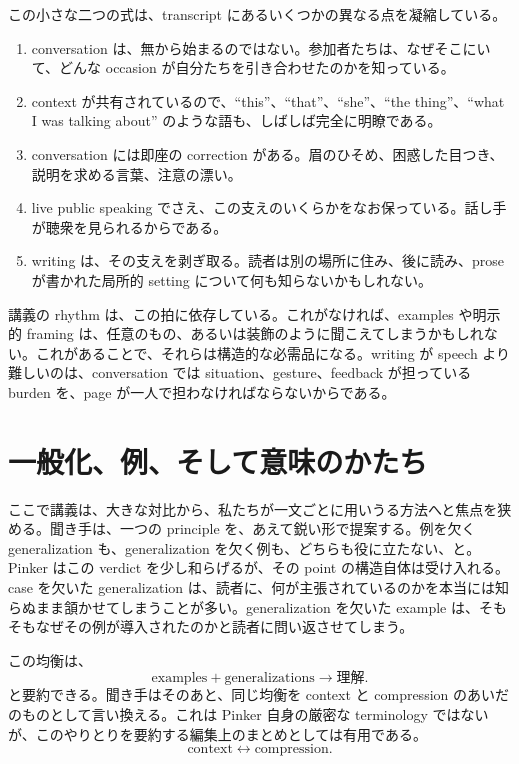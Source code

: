この小さな二つの式は、transcript にあるいくつかの異なる点を凝縮している。
\begin{enumerate}
\item conversation は、無から始まるのではない。参加者たちは、なぜそこにいて、どんな occasion が自分たちを引き合わせたのかを知っている。
\item context が共有されているので、``this''、``that''、``she''、``the thing''、``what I was talking about'' のような語も、しばしば完全に明瞭である。
\item conversation には即座の correction がある。眉のひそめ、困惑した目つき、説明を求める言葉、注意の漂い。
\item live public speaking でさえ、この支えのいくらかをなお保っている。話し手が聴衆を見られるからである。
\item writing は、その支えを剥ぎ取る。読者は別の場所に住み、後に読み、prose が書かれた局所的 setting について何も知らないかもしれない。
\end{enumerate}

講義の rhythm は、この拍に依存している。これがなければ、examples や明示的 framing は、任意のもの、あるいは装飾のように聞こえてしまうかもしれない。これがあることで、それらは構造的な必需品になる。writing が speech より難しいのは、conversation では situation、gesture、feedback が担っている burden を、page が一人で担わなければならないからである。

\section{一般化、例、そして意味のかたち}

ここで講義は、大きな対比から、私たちが一文ごとに用いうる方法へと焦点を狭める。聞き手は、一つの principle を、あえて鋭い形で提案する。例を欠く generalization も、generalization を欠く例も、どちらも役に立たない、と。Pinker はこの verdict を少し和らげるが、その point の構造自体は受け入れる。case を欠いた generalization は、読者に、何が主張されているのかを本当には知らぬまま頷かせてしまうことが多い。generalization を欠いた example は、そもそもなぜその例が導入されたのかと読者に問い返させてしまう。

この均衡は、
\begin{equation}
\text{examples} + \text{generalizations} \to \text{理解}.
\end{equation}
と要約できる。聞き手はそのあと、同じ均衡を context と compression のあいだのものとして言い換える。これは Pinker 自身の厳密な terminology ではないが、このやりとりを要約する編集上のまとめとしては有用である。
\begin{equation}
\text{context} \leftrightarrow \text{compression}.
\end{equation}

